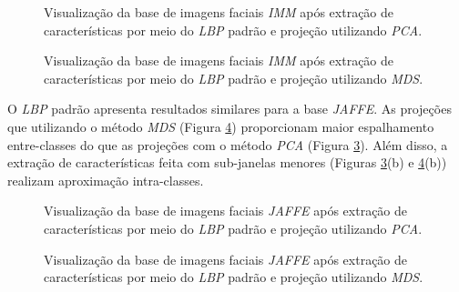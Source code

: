 \documentclass[conference]{IEEEtran}
\begin{document}
\begin{figure}[h]
\center
\leavevmode
{}
\qquad
{}
\caption{Visualização da base de imagens faciais \textit{IMM} após extração de características por meio do \textit{LBP} padrão e projeção utilizando \textit{PCA}.}
 \label{fig_lbp_result_padrao_imm_pca}
\end{figure}


\begin{figure}[h]
\center
\leavevmode
{}
\qquad
{}
\caption{Visualização da base de imagens faciais \textit{IMM} após extração de características por meio do \textit{LBP} padrão e projeção utilizando \textit{MDS}.}
 \label{fig_lbp_result_padrao_imm}
\end{figure}

O \textit{LBP} padrão apresenta resultados similares para a base \textit{JAFFE}. As projeções que utilizando o método \textit{MDS} (Figura \ref{fig_lbp_result_padrao_jaffe}) proporcionam maior espalhamento entre-classes do que as projeções com o método \textit{PCA} (Figura \ref{fig_lbp_result_padrao_jaffe_pca}). Além disso, a extração de características feita com sub-janelas menores (Figuras \ref{fig_lbp_result_padrao_jaffe_pca}(b) e \ref{fig_lbp_result_padrao_jaffe}(b)) realizam aproximação intra-classes.

\begin{figure}[h]
\center
\leavevmode
{}
\qquad
{}
\caption{Visualização da base de imagens faciais \textit{JAFFE} após extração de características por meio do \textit{LBP} padrão e projeção utilizando \textit{PCA}.}
 \label{fig_lbp_result_padrao_jaffe_pca}
\end{figure}

\begin{figure}[h]
\center
\leavevmode
{}
\qquad
{}
\caption{Visualização da base de imagens faciais \textit{JAFFE} após extração de características por meio do \textit{LBP} padrão e projeção utilizando \textit{MDS}.}
 \label{fig_lbp_result_padrao_jaffe}
\end{figure}
\end{document}
